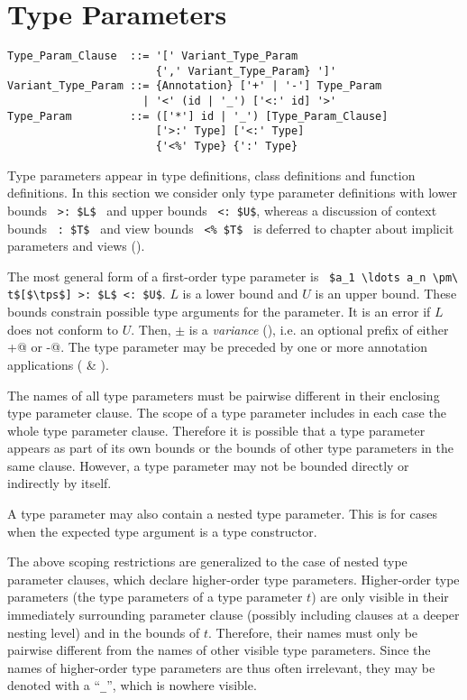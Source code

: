\section{Type Parameters}

\syntax\begin{lstlisting}
Type_Param_Clause  ::= '[' Variant_Type_Param 
                       {',' Variant_Type_Param} ']'
Variant_Type_Param ::= {Annotation} ['+' | '-'] Type_Param
                     | '<' (id | '_') ['<:' id] '>'
Type_Param         ::= (['*'] id | '_') [Type_Param_Clause]
                       ['>:' Type] ['<:' Type]
                       {'<%' Type} {':' Type}
\end{lstlisting}

Type parameters appear in type definitions, class definitions and function definitions. In this section we consider only type parameter definitions with lower bounds ~\lstinline!>: $L$!~ and upper bounds ~\lstinline!<: $U$!, whereas a discussion of context bounds ~\lstinline!: $T$!~ and view bounds ~\lstinline!<% $T$!~ is deferred to chapter about implicit parameters and views ().

The most general form of a first-order type parameter is ~\lstinline!$a_1 \ldots a_n \pm\ t$[$\tps$] >: $L$ <: $U$!. $L$ is a lower bound and $U$ is an upper bound. These bounds constrain possible type arguments for the parameter. It is an error if $L$ does not conform to $U$. Then, $\pm$ is a {\em variance} (), i.e. an optional prefix of either \lstinline@+@ or \lstinline@-@. The type parameter may be preceded by one or more annotation applications ( \& ).

The names of all type parameters must be pairwise different in their enclosing type parameter clause. The scope of a type parameter includes in each case the whole type parameter clause. Therefore it is possible that a type parameter appears as part of its own bounds or the bounds of other type parameters in the same clause. However, a type parameter may not be bounded directly or indirectly by itself. 

A type parameter may also contain a nested type parameter. This is for cases when the expected type argument is a type constructor. 

The above scoping restrictions are generalized to the case of nested type parameter clauses, which declare higher-order type parameters. Higher-order type parameters (the type parameters of a type parameter $t$) are only visible in their immediately surrounding parameter clause (possibly including clauses at a deeper nesting level) and in the bounds of $t$. Therefore, their names must only be pairwise different from the names of other visible type parameters. Since the names of higher-order type parameters are thus often irrelevant, they may be denoted with a ``\lstinline!_!'', which is nowhere visible. 

